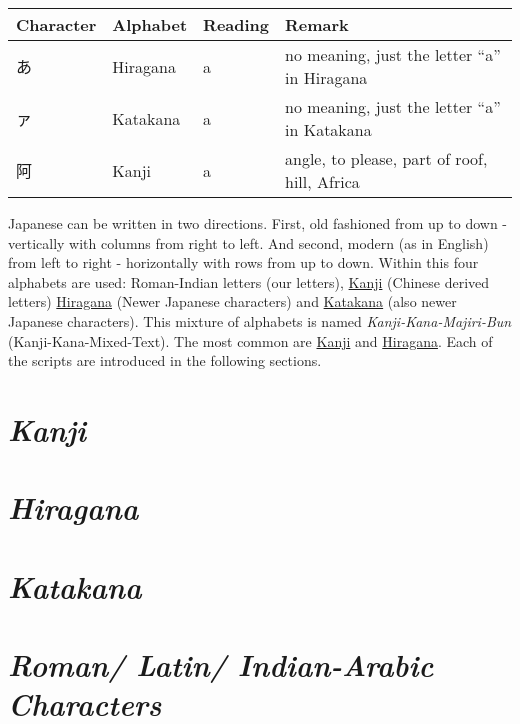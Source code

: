 \begin{center}
\begin{tabular}{|l|l|l|l|}
\textbf{Character}&\textbf{Alphabet}&\textbf{Reading}&\textbf{Remark}\\\hline
あ& Hiragana & a & no meaning, just the letter  ``a'' in Hiragana \\
ァ& Katakana & a & no meaning, just the letter ``a'' in Katakana \\
阿& Kanji    & a & { angle, to please, part of roof, hill, Africa}\\
\end{tabular}
\end{center}

Japanese can be written in two directions. First, old fashioned from up to down
- vertically with columns from right to left. And second, modern (as in
  English) from left to right - horizontally with rows from up to down. Within
  this four alphabets are used: Roman-Indian letters (our letters),
  \hyperref[sec:Kanji]{Kanji} (Chinese derived letters)
  \hyperref[sec:Hiragana]{Hiragana} (Newer Japanese characters) and
   \hyperref[sec:Katakana]{Katakana}  (also newer Japanese characters).  This
  mixture of alphabets is named \textit{Kanji-Kana-Majiri-Bun}
  (Kanji-Kana-Mixed-Text). The most common are \hyperref[sec:Kanji]{Kanji} and
  \hyperref[sec:Hiragana]{Hiragana}. Each of the scripts are introduced in the
  following sections.

\section*{\textit{Kanji}} 


\section*{\textit{Hiragana}}


\section*{\textit{Katakana}}


\section*{\textit{Roman/ Latin/ Indian-Arabic Characters}}


